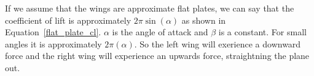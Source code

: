 If we assume that the wings are approximate flat plates, we can say that the
coefficient of lift is approximately $2\pi\sin(\alpha)$ as shown in Equation~\ref{flat_plate_cl}. 
$\alpha$ is
the angle of attack and $\beta$ is a constant. For small angles it is 
approximately $2\pi(\alpha)$. So the left wing will exerience a downward force
and the right wing will experience an upwards force, straightning the plane out.




